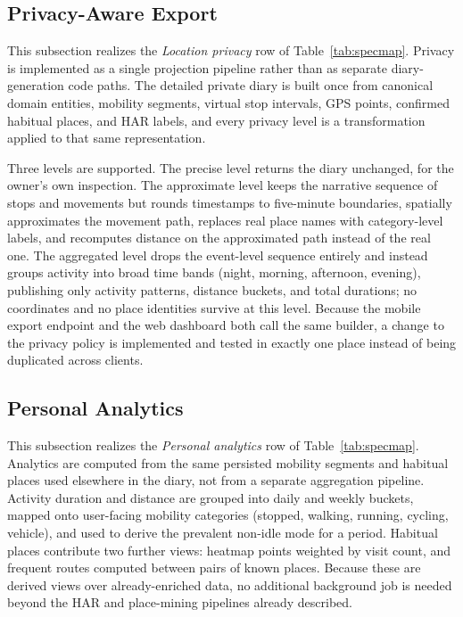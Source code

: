 \documentclass[conference,a4paper]{IEEEtran}
\begin{document}
\subsection{Privacy-Aware Export}

This subsection realizes the \textit{Location privacy} row of Table~\ref{tab:specmap}. Privacy is implemented as a single projection pipeline rather than as separate diary-generation code paths. The detailed private diary is built once from canonical domain entities, mobility segments, virtual stop intervals, GPS points, confirmed habitual places, and HAR labels, and every privacy level is a transformation applied to that same representation.

Three levels are supported. The precise level returns the diary unchanged, for the owner's own inspection. The approximate level keeps the narrative sequence of stops and movements but rounds timestamps to five-minute boundaries, spatially approximates the movement path, replaces real place names with category-level labels, and recomputes distance on the approximated path instead of the real one. The aggregated level drops the event-level sequence entirely and instead groups activity into broad time bands (night, morning, afternoon, evening), publishing only activity patterns, distance buckets, and total durations; no coordinates and no place identities survive at this level. Because the mobile export endpoint and the web dashboard both call the same builder, a change to the privacy policy is implemented and tested in exactly one place instead of being duplicated across clients.

\subsection{Personal Analytics}

This subsection realizes the \textit{Personal analytics} row of Table~\ref{tab:specmap}. Analytics are computed from the same persisted mobility segments and habitual places used elsewhere in the diary, not from a separate aggregation pipeline. Activity duration and distance are grouped into daily and weekly buckets, mapped onto user-facing mobility categories (stopped, walking, running, cycling, vehicle), and used to derive the prevalent non-idle mode for a period. Habitual places contribute two further views: heatmap points weighted by visit count, and frequent routes computed between pairs of known places. Because these are derived views over already-enriched data, no additional background job is needed beyond the HAR and place-mining pipelines already described.
\end{document}
